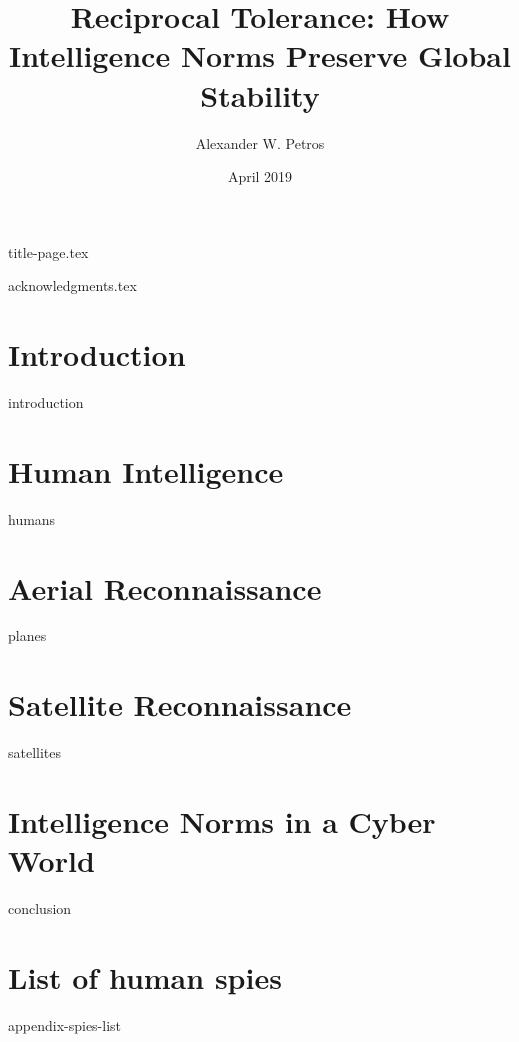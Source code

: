 \documentclass[11pt]{memoir}
\title{Reciprocal Tolerance: How Intelligence Norms Preserve Global Stability}
\author{Alexander W. Petros}
\date{April 2019}
\begin{document}
    \frontmatter
    {title-page.tex}

    \tableofcontents
    \newpage
    \thispagestyle{empty}

    \listoffigures
    \listoftables

    {acknowledgments.tex}


    \mainmatter
    \chapter{Introduction}
    {introduction}

    \chapter{Human Intelligence}
    {humans}

    \chapter{Aerial Reconnaissance}
    {planes}

    \chapter{Satellite Reconnaissance}
    {satellites}

    \chapter{Intelligence Norms in a Cyber World}
    {conclusion}


    \appendix
    \chapter{List of human spies}
    {appendix-spies-list}
\end{document}
